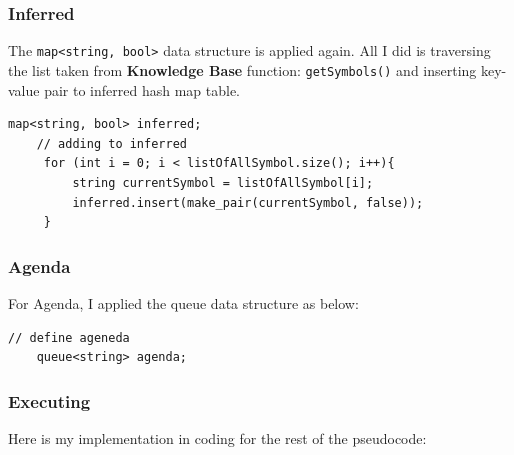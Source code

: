 \documentclass{assignment}
\begin{document}
\subsubsection{Inferred}

The \texttt{map<string, bool>} data structure is applied again. All I did is traversing the list taken from \textbf{Knowledge Base} function: \texttt{getSymbols()} and inserting key-value pair to inferred hash map table. 

\lstset{language=C++}
\begin{lstlisting}[caption={Define Inferred}]
    map<string, bool> inferred;
    // adding to inferred
     for (int i = 0; i < listOfAllSymbol.size(); i++){
         string currentSymbol = listOfAllSymbol[i];
         inferred.insert(make_pair(currentSymbol, false));
     }
\end{lstlisting}

\subsubsection{Agenda}
For Agenda, I applied the queue data structure as below:

\lstset{language=C++}
\begin{lstlisting}[caption={Define Agenda}]
	// define ageneda
    queue<string> agenda;
\end{lstlisting}

\subsubsection{Executing}

Here is my implementation in coding for the rest of the pseudocode:
\end{document}
